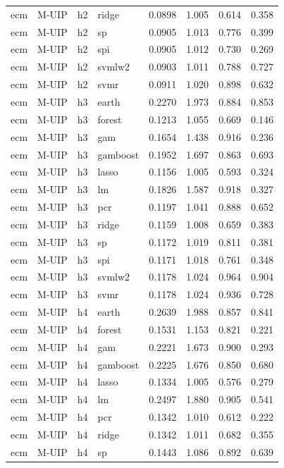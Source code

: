 \begin{ThreePartTable}
\begin{longtable}[t]{llclcccc}
ecm & M-UIP & h2 & ridge & 0.0898 & 1.005 & 0.614 & 0.358\\
ecm & M-UIP & h2 & sp & 0.0905 & 1.013 & 0.776 & 0.399\\
ecm & M-UIP & h2 & spi & 0.0905 & 1.012 & 0.730 & 0.269\\
ecm & M-UIP & h2 & svmlw2 & 0.0903 & 1.011 & 0.788 & 0.727\\
ecm & M-UIP & h2 & svmr & 0.0911 & 1.020 & 0.898 & 0.632\\
\addlinespace
ecm & M-UIP & h3 & earth & 0.2270 & 1.973 & 0.884 & 0.853\\
ecm & M-UIP & h3 & forest & 0.1213 & 1.055 & 0.669 & 0.146\\
ecm & M-UIP & h3 & gam & 0.1654 & 1.438 & 0.916 & 0.236\\
ecm & M-UIP & h3 & gamboost & 0.1952 & 1.697 & 0.863 & 0.693\\
ecm & M-UIP & h3 & lasso & 0.1156 & 1.005 & 0.593 & 0.324\\
ecm & M-UIP & h3 & lm & 0.1826 & 1.587 & 0.918 & 0.327\\
ecm & M-UIP & h3 & pcr & 0.1197 & 1.041 & 0.888 & 0.652\\
ecm & M-UIP & h3 & ridge & 0.1159 & 1.008 & 0.659 & 0.383\\
ecm & M-UIP & h3 & sp & 0.1172 & 1.019 & 0.811 & 0.381\\
ecm & M-UIP & h3 & spi & 0.1171 & 1.018 & 0.761 & 0.348\\
ecm & M-UIP & h3 & svmlw2 & 0.1178 & 1.024 & 0.964 & 0.904\\
ecm & M-UIP & h3 & svmr & 0.1178 & 1.024 & 0.936 & 0.728\\
\addlinespace
ecm & M-UIP & h4 & earth & 0.2639 & 1.988 & 0.857 & 0.841\\
ecm & M-UIP & h4 & forest & 0.1531 & 1.153 & 0.821 & 0.221\\
ecm & M-UIP & h4 & gam & 0.2221 & 1.673 & 0.900 & 0.293\\
ecm & M-UIP & h4 & gamboost & 0.2225 & 1.676 & 0.850 & 0.680\\
ecm & M-UIP & h4 & lasso & 0.1334 & 1.005 & 0.576 & 0.279\\
ecm & M-UIP & h4 & lm & 0.2497 & 1.880 & 0.905 & 0.541\\
ecm & M-UIP & h4 & pcr & 0.1342 & 1.010 & 0.612 & 0.222\\
ecm & M-UIP & h4 & ridge & 0.1342 & 1.011 & 0.682 & 0.355\\
ecm & M-UIP & h4 & sp & 0.1443 & 1.086 & 0.892 & 0.639\\

\end{longtable}
\end{ThreePartTable}
